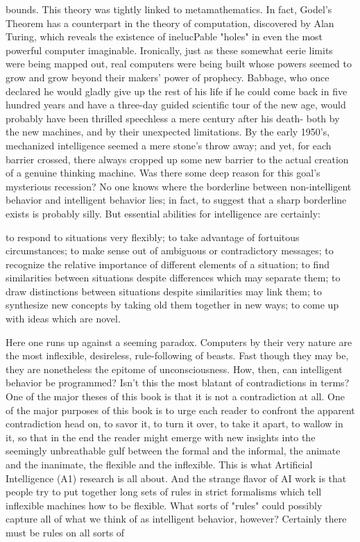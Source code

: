 






bounds. This theory was tightly linked to metamathematics. In fact, Godel's Theorem has a counterpart in the theory of computation, discovered by Alan Turing, which reveals the existence of inelucPable "holes" in even the most powerful computer imaginable. Ironically, just as these somewhat eerie limits were being mapped out, real computers were being built whose powers seemed to grow and grow beyond their makers' power of prophecy. Babbage, who once declared he would gladly give up the rest of his life if he could come back in five hundred years and have a three-day guided scientific tour of the new age, would probably have been thrilled speechless a mere century after his death- both by the new machines, and by their unexpected limitations. By the early 1950's, mechanized intelligence seemed a mere stone's throw away; and yet, for each barrier crossed, there always cropped up some new barrier to the actual creation of a genuine thinking machine. Was there some deep reason for this goal's mysterious recession? No one knows where the borderline between non-intelligent behavior and intelligent behavior lies; in fact, to suggest that a sharp borderline exists is probably silly. But essential abilities for intelligence are certainly: 

to respond to situations very flexibly; to take advantage of fortuitous circumstances; to make sense out of ambiguous or contradictory messages; to recognize the relative importance of different elements of a situation; to find similarities between situations despite differences which may separate them; to draw distinctions between situations despite similarities may link them; to synthesize new concepts by taking old them together in new ways; to come up with ideas which are novel. 

Here one runs up against a seeming paradox. Computers by their very nature are the most inflexible, desireless, rule-following of beasts. Fast though they may be, they are nonetheless the epitome of unconsciousness. How, then, can intelligent behavior be programmed? Isn't this the most blatant of contradictions in terms? One of the major theses of this book is that it is not a contradiction at all. One of the major purposes of this book is to urge each reader to confront the apparent contradiction head on, to savor it, to turn it over, to take it apart, to wallow in it, so that in the end the reader might emerge with new insights into the seemingly unbreathable gulf between the formal and the informal, the animate and the inanimate, the flexible and the inflexible. This is what Artificial Intelligence (A1) research is all about. And the strange flavor of AI work is that people try to put together long sets of rules in strict formalisms which tell inflexible machines how to be flexible. What sorts of "rules" could possibly capture all of what we think of as intelligent behavior, however? Certainly there must be rules on all sorts of 








